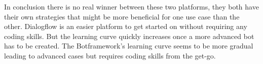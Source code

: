 In conclusion there is no real winner between these two platforms, they both have their own strategies that might be more beneficial for one use case than the other. Dialogflow is an easier platform to get started on without requiring any coding skills. But the learning curve quickly increases once a more advanced bot has to be created. The Botframework's learning curve seems to be more gradual leading to advanced cases but requires coding skills from the get-go.